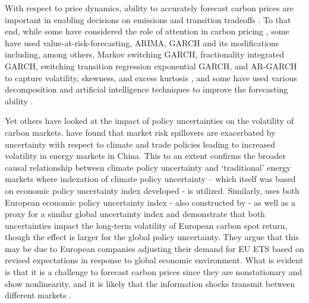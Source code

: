 \documentclass[preprint, 3p,
authoryear]{elsarticle} %
\begin{document}
With respect to price dynamics, ability to accurately forecast carbon
prices are important in enabling decisions on emissions and transition
tradeoffs
\citep{wang_novel_2021, zhang_forecasting_2024, chen_multiscale_2024}.
To that end, while some have considered the role of attention in carbon
pricing
\citep{zheng_relationship_2022, gong_climate_2023, zhang_forecasting_2024},
some have used value-at-risk-forecasting, ARIMA, GARCH and its
modifications including, among others, Markov switching GARCH,
fractionality integrated GARCH, switching transition regression
exponential GARCH, and AR-GARCH to capture volatility, skewness, and
excess kurtosis
\citep{paolella_econometric_2008, benz_modeling_2009, arouri_nonlinearities_2012, byun_forecasting_2013, garcia-martos_modelling_2013, huang_hybrid_2021},
and some have used various decomposition and artificial intelligence
techniques to improve the forecasting ability
\citep{QIN2024131410, wang_novel_2021, chen_multiscale_2024}.

Yet others have looked at the impact of policy uncertainties on the
volatility of carbon markets. \citet{dong_extreme_2024} have found that
market risk spillovers are exacerbated by uncertainty with respect to
climate and trade policies leading to increased volatility in energy
markets in China. This to an extent confirms the broader causal
relationship between climate policy uncertainty and `traditional' energy
markets \citep{REN2023113058} where indexation of climate policy
uncertainty \citep{gavriilidis_measuring_2021} -- which itself was based
on economic policy uncertainty index developed
\citet{baker_measuring_2016} - is utilized. Similarly,
\citet{dai_impact_2022} uses both European economic policy uncertainty
index - also constructed by \citet{baker_measuring_2016} - as well as a
proxy for a similar global uncertainty index and demonstrate that both
uncertainties impact the long-term volatility of European carbon spot
return, though the effect is larger for the global policy uncertainty.
They argue that this may be due to European companies adjusting their
demand for EU ETS based on revised expectations in response to global
economic environment. What is evident is that it is a challenge to
forecast carbon prices since they are nonstationary and show
nonlinearity, and it is likely that the information shocks transmit
between different markets
\citep{chen_multiscale_2024, feng_carbon_2011, lutz_nonlinearity_2013, segnon_modeling_2017}.
\end{document}
